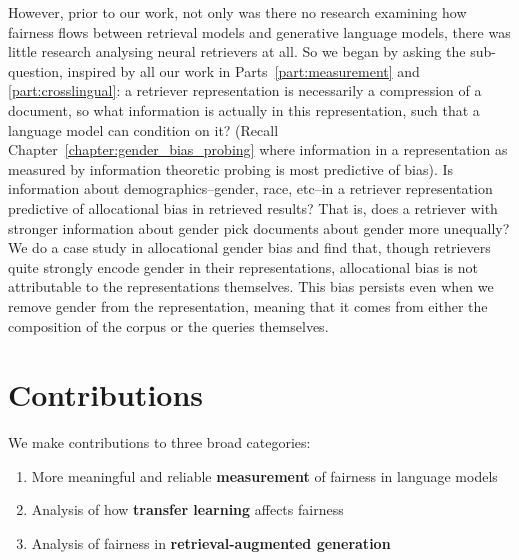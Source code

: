 However, prior to our work, not only was there no research examining how fairness flows between retrieval models and generative language models, there was little research analysing neural retrievers at all. So we began by asking the sub-question, inspired by all our work in Parts~\ref{part:measurement} and \ref{part:crosslingual}: a retriever representation is necessarily a compression of a document, so what information is actually in this representation, such that 
 a language model can condition on it? (Recall Chapter~\ref{chapter:gender_bias_probing} where information in a representation as measured by information theoretic probing is most predictive of bias). Is information about demographics--gender, race, etc--in a retriever representation predictive of allocational bias in retrieved results? That is, does a retriever with stronger information about gender pick documents about gender more unequally? We do a case study in allocational gender bias and find that, though retrievers quite strongly encode gender in their representations, allocational bias is not attributable to the representations themselves. This bias persists even when we remove gender from the representation, meaning that it comes from either the composition of the corpus or the queries themselves. 
 

\section{Contributions}
We make contributions to three broad categories: 
\begin{enumerate}
    \item More meaningful and reliable \textbf{measurement} of fairness in language models
    \item Analysis of how \textbf{transfer learning} affects fairness
    \item Analysis of fairness in \textbf{retrieval-augmented generation}    
\end{enumerate}

